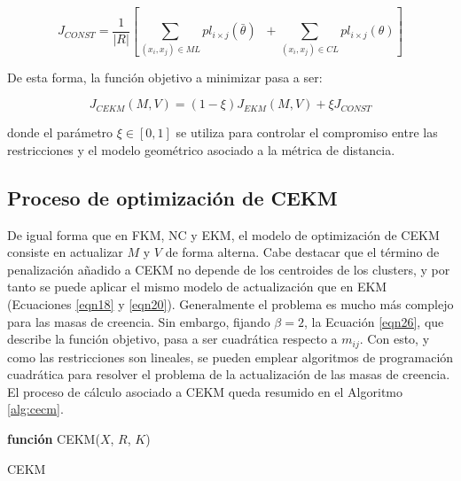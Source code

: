 \begin{equation}
J_{CONST} = \frac{1}{|R|} \left[\sum_{(x_i,x_j) \in ML} pl_{i\times j} (\bar{\theta})\;\; + \sum_{(x_i,x_j) \in CL} pl_{i\times j} (\theta)\right]
\label{eqn25}
\end{equation}

De esta forma, la función objetivo a minimizar pasa a ser:

\begin{equation}
J_{CEKM}(M,V) = (1- \xi)J_{EKM}(M,V) + \xi J_{CONST}
\label{eqn26}
\end{equation}

donde el parámetro $\xi \in [0,1]$ se utiliza para controlar el compromiso entre las restricciones y el modelo geométrico asociado a la métrica de distancia.

\subsection{Proceso de optimización de CEKM}

De igual forma que en \acs{FKM}, \acs{NC} y \acs{EKM}, el modelo de optimización de \acs{CEKM} consiste en actualizar $M$ y $V$ de forma alterna. Cabe destacar que el término de penalización añadido a \acs{CEKM} no depende de los centroides de los clusters, y por tanto se puede aplicar el mismo modelo de actualización que en \acs{EKM} (Ecuaciones \ref{eqn18} y \ref{eqn20}). Generalmente el problema es mucho más complejo para las masas de creencia. Sin embargo, fijando $\beta = 2$, la Ecuación \ref{eqn26}, que describe la función objetivo, pasa a ser cuadrática respecto a $m_{ij}$. Con esto, y como las restricciones son lineales, se pueden emplear algoritmos de programación cuadrática para resolver el problema de la actualización de las masas de creencia. El proceso de cálculo asociado a \acs{CEKM} queda resumido en el Algoritmo \ref{alg:cecm}. 


\begin{algorithm}
	
	\BlankLine
	\BlankLine
	\textbf{función} CEKM($X$, $R$, $K$) 
	\caption{\acf{CEKM}}
	\label{alg:cecm}
\end{algorithm}

